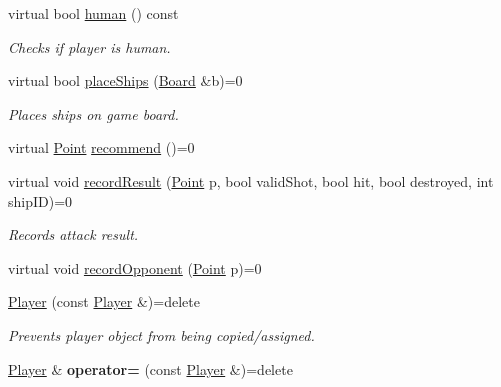 \begin{DoxyCompactItemize}
virtual bool \mbox{\hyperlink{class_player_a47c5497b2d8bf5d745e85952d0bf097f}{human}} () const
\begin{DoxyCompactList}\small\item\em Checks if player is human. \end{DoxyCompactList}\item 
\mbox{\label{class_player_ab89c1180c7314d3e19bcf4b2bed2e02a}} 
virtual bool \mbox{\hyperlink{class_player_ab89c1180c7314d3e19bcf4b2bed2e02a}{place\+Ships}} (\mbox{\hyperlink{class_board}{Board}} \&b)=0
\begin{DoxyCompactList}\small\item\em Places ships on game board. \end{DoxyCompactList}\item 
virtual \mbox{\hyperlink{class_point}{Point}} \mbox{\hyperlink{class_player_a2cc7a83d11158eafd8d49d4b9f23ce56}{recommend}} ()=0
\item 
\mbox{\label{class_player_a368527cfefaac58dc942b32658f977ed}} 
virtual void \mbox{\hyperlink{class_player_a368527cfefaac58dc942b32658f977ed}{record\+Result}} (\mbox{\hyperlink{class_point}{Point}} p, bool valid\+Shot, bool hit, bool destroyed, int ship\+ID)=0
\begin{DoxyCompactList}\small\item\em Records attack result. \end{DoxyCompactList}\item 
virtual void \mbox{\hyperlink{class_player_a768e14edee61e208e6fd295cdd72a49c}{record\+Opponent}} (\mbox{\hyperlink{class_point}{Point}} p)=0
\item 
\mbox{\label{class_player_ae8015d1f08ba69d663cfdaea1a64d1a4}} 
\mbox{\hyperlink{class_player_ae8015d1f08ba69d663cfdaea1a64d1a4}{Player}} (const \mbox{\hyperlink{class_player}{Player}} \&)=delete
\begin{DoxyCompactList}\small\item\em Prevents player object from being copied/assigned. \end{DoxyCompactList}\item 
\mbox{\label{class_player_ab81d34e4adb4e329d26b1635d866462d}} 
\mbox{\hyperlink{class_player}{Player}} \& {\bfseries operator=} (const \mbox{\hyperlink{class_player}{Player}} \&)=delete
\end{DoxyCompactItemize}


